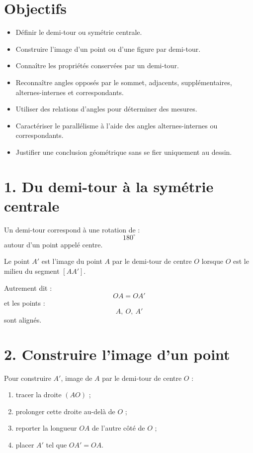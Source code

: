 
\section{Objectifs}

\begin{itemize}
\item Définir le demi-tour ou symétrie centrale.
\item Construire l'image d'un point ou d'une figure par demi-tour.
\item Connaître les propriétés conservées par un demi-tour.
\item Reconnaître angles opposés par le sommet, adjacents, supplémentaires, alternes-internes et correspondants.
\item Utiliser des relations d'angles pour déterminer des mesures.
\item Caractériser le parallélisme à l'aide des angles alternes-internes ou correspondants.
\item Justifier une conclusion géométrique sans se fier uniquement au dessin.
\end{itemize}

\section{1. Du demi-tour à la symétrie centrale}

Un demi-tour correspond à une rotation de :
\[
180^\circ
\]
autour d'un point appelé centre.

\begin{definition}
Le point $A'$ est l'image du point $A$ par le demi-tour de centre $O$ lorsque $O$ est le milieu du segment $[AA']$.
\end{definition}

Autrement dit :
\[
OA=OA'
\]
et les points :
\[
A,\ O,\ A'
\]
sont alignés.


\section{2. Construire l'image d'un point}

Pour construire $A'$, image de $A$ par le demi-tour de centre $O$ :
\begin{enumerate}
\item tracer la droite $(AO)$ ;
\item prolonger cette droite au-delà de $O$ ;
\item reporter la longueur $OA$ de l'autre côté de $O$ ;
\item placer $A'$ tel que $OA'=OA$.
\end{enumerate}

